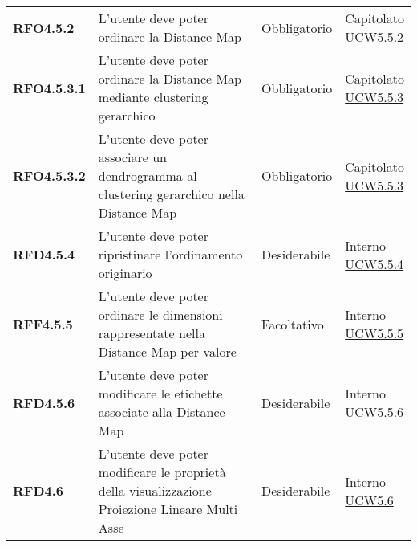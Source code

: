 \begin{longtable}[H]{| >{\raggedright\bfseries}m{20mm} | >{\raggedright}m{90mm} | >{\centering}m{25mm} | >{\centering\arraybackslash}m{30mm}|}
    RFO4.5.2
     & L'utente deve poter ordinare la Distance Map
     & Obbligatorio
     & \makecell{ Capitolato                                                                                             \\ \hyperref[par:ucw5.5.2]{UCW5.5.2} }\\

    RFO4.5.3.1
     & L'utente deve poter ordinare la Distance Map mediante clustering gerarchico
     & Obbligatorio
     & \makecell{ Capitolato                                                                                             \\ \hyperref[par:ucw5.5.3]{UCW5.5.3} }\\

    RFO4.5.3.2
     & L'utente deve poter associare un dendrogramma al clustering gerarchico nella Distance Map
     & Obbligatorio
     & \makecell{ Capitolato                                                                                             \\ \hyperref[par:ucw5.5.3]{UCW5.5.3} }\\

    RFD4.5.4
     & L'utente deve poter ripristinare l'ordinamento originario
     & Desiderabile
     & \makecell{ Interno                                                                                                \\ \hyperref[par:ucw5.5.4]{UCW5.5.4} }\\

    RFF4.5.5
     & L'utente deve poter ordinare le dimensioni rappresentate nella Distance Map per valore
     & Facoltativo
     & \makecell{ Interno                                                                                                \\ \hyperref[par:ucw5.5.5]{UCW5.5.5} }\\

    RFD4.5.6
     & L'utente deve poter modificare le etichette associate alla Distance Map
     & Desiderabile
     & \makecell{ Interno                                                                                                \\ \hyperref[par:ucw5.5.6]{UCW5.5.6} }\\

    RFD4.6
     & L'utente deve poter modificare le proprietà della visualizzazione Proiezione Lineare Multi Asse
     & Desiderabile
     & \makecell{ Interno                                                                                                \\  \hyperref[ssub:ucw5.6]{UCW5.6} }\\


\end{longtable}
